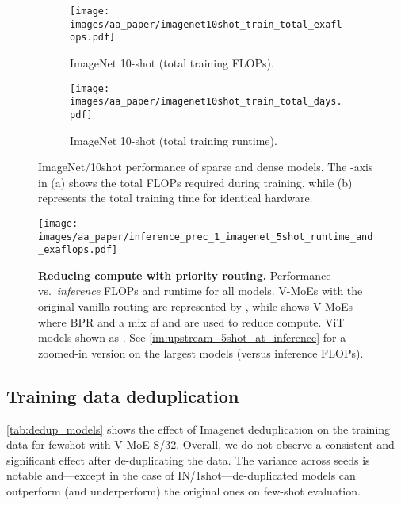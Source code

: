 \documentclass{article}
\newcommand{\abbv}{{V-MoE}}
\begin{document}
\begin{figure}
\centering
\begin{subfigure}{.50\textwidth}
  \centering
  \texttt{[image: images/aa\_paper/imagenet10shot\_train\_total\_exaflops.pdf]}
  \caption{ImageNet 10-shot (total training FLOPs).}
  \label{im:fewshot_10_flops}
\end{subfigure}\begin{subfigure}{.50\textwidth}
  \centering
  \texttt{[image: images/aa\_paper/imagenet10shot\_train\_total\_days.pdf]}
  \caption{ImageNet 10-shot (total training runtime).}
  \label{im:fewshot_10_runtime}
\end{subfigure}
\caption{
ImageNet/10shot performance of sparse and dense models.
The -axis in (a) shows the total FLOPs required during training, while (b) represents the total training time for identical hardware.
}
\label{im:fewshot_10_flops_and_runtime}
\end{figure}







\begin{figure}
\centering
\texttt{[image: images/aa\_paper/inference\_prec\_1\_imagenet\_5shot\_runtime\_and\_exaflops.pdf]}
\caption{\textbf{Reducing compute with priority routing.} Performance vs.\ \emph{inference} FLOPs and runtime for all models.
\abbv{}s with the original vanilla routing are represented by , while  shows \abbv{}s where BPR and a mix of  and  are used to reduce compute. 
ViT models shown as .
See \cref{im:upstream_5shot_at_inference} for a zoomed-in version on the largest models (versus inference FLOPs).\label{im:upstream_5shot_at_inference_all}}\label{im:inference_vs_runtime}
\end{figure}


\subsection{Training data deduplication}\label{sec:dedup_models}

\cref{tab:dedup_models} shows the effect of Imagenet deduplication on the training data for fewshot with \abbv{}-S/32.
Overall, we do not observe a consistent and significant effect after de-duplicating the data.
The variance across seeds is notable and---except in the case of IN/1shot---de-duplicated models can outperform (and underperform) the original ones on few-shot evaluation.
\end{document}
